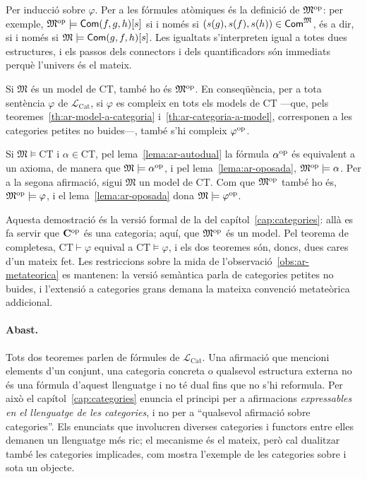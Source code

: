 \begin{prova}
Per inducció sobre $\varphi$. Per a les fórmules atòmiques és la definició de $\mathfrak M^{\mathrm{op}}$: per exemple, $\mathfrak M^{\mathrm{op}}\models\mathsf{Com}(f,g,h)[s]$ si i només si $(s(g),s(f),s(h))\in\mathsf{Com}^{\mathfrak M}$, és a dir, si i només si $\mathfrak M\models\mathsf{Com}(g,f,h)[s]$. Les igualtats s'interpreten igual a totes dues estructures, i els passos dels connectors i dels quantificadors són immediats perquè l'univers és el mateix.
\end{prova}

\begin{teorema}\label{teo:ar-dualitat-sem}
Si $\mathfrak M$ és un model de $\mathrm{CT}$, també ho és $\mathfrak M^{\mathrm{op}}$. En conseqüència, per a tota sentència $\varphi$ de $\mathcal L_{\mathrm{Cat}}$, si $\varphi$ es compleix en tots els models de $\mathrm{CT}$ ---que, pels teoremes~\ref{th:ar-model-a-categoria} i~\ref{th:ar-categoria-a-model}, corresponen a les categories petites no buides---, també s'hi compleix $\varphi^{\mathrm{op}}$.
\end{teorema}

\begin{prova}
Si $\mathfrak M\models\mathrm{CT}$ i $\alpha\in\mathrm{CT}$, pel lema~\ref{lema:ar-autodual} la fórmula $\alpha^{\mathrm{op}}$ és equivalent a un axioma, de manera que $\mathfrak M\models\alpha^{\mathrm{op}}$, i pel lema~\ref{lema:ar-oposada}, $\mathfrak M^{\mathrm{op}}\models\alpha$. Per a la segona afirmació, sigui $\mathfrak M$ un model de $\mathrm{CT}$. Com que $\mathfrak M^{\mathrm{op}}$ també ho és, $\mathfrak M^{\mathrm{op}}\models\varphi$, i el lema~\ref{lema:ar-oposada} dona $\mathfrak M\models\varphi^{\mathrm{op}}$.
\end{prova}

Aquesta demostració és la versió formal de la del capítol~\ref{cap:categories}: allà es fa servir que $\mathbf{C}^{\mathrm{op}}$ és una categoria; aquí, que $\mathfrak M^{\mathrm{op}}$ és un model. Pel teorema de completesa, $\mathrm{CT}\vdash\varphi$ equival a $\mathrm{CT}\models\varphi$, i els dos teoremes són, doncs, dues cares d'un mateix fet. Les restriccions sobre la mida de l'observació~\ref{obs:ar-metateorica} es mantenen: la versió semàntica parla de categories petites no buides, i l'extensió a categories grans demana la mateixa convenció metateòrica addicional.

\paragraph{Abast.}
Tots dos teoremes parlen de fórmules de $\mathcal L_{\mathrm{Cat}}$. Una afirmació que mencioni elements d'un conjunt, una categoria concreta o qualsevol estructura externa no és una fórmula d'aquest llenguatge i no té dual fins que no s'hi reformula. Per això el capítol~\ref{cap:categories} enuncia el principi per a afirmacions \emph{expressables en el llenguatge de les categories}, i no per a \enquote{qualsevol afirmació sobre categories}. Els enunciats que involucren diverses categories i functors entre elles demanen un llenguatge més ric; el mecanisme és el mateix, però cal dualitzar també les categories implicades, com mostra l'exemple de les categories sobre i sota un objecte.


